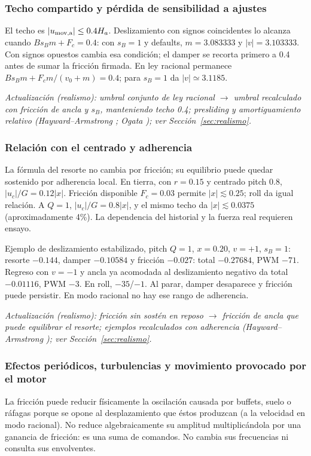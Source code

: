 \subsubsection{Techo compartido y pérdida de sensibilidad a ajustes}
El techo es $|u_{\rm mov,a}|\le0.4H_a$. Deslizamiento con signos coincidentes lo alcanza cuando $Bs_Bm+F_c=0.4$: con $s_B=1$ y defaults, $m=3.083333$ y $|v|=3.103333$. Con signos opuestos cambia esa condición; el damper se recorta primero a 0.4 antes de sumar la fricción firmada. En ley racional permanece $Bs_Bm+F_cm/(v_0+m)=0.4$; para $s_B=1$ da $|v|\simeq3.1185$.

\textit{Actualización (realismo): umbral conjunto de ley racional $\rightarrow$ umbral recalculado con fricción de ancla y $s_B$, manteniendo techo 0.4; presliding y amortiguamiento relativo (Hayward--Armstrong \cite{hayward2000}; Ogata \cite{ogata}); ver Sección~\ref{sec:realismo}.}

\subsubsection{Relación con el centrado y adherencia}
La fórmula del resorte no cambia por fricción; su equilibrio puede quedar sostenido por adherencia local. En tierra, con $r=0.15$ y centrado pitch 0.8, $|u_c|/G=0.12|x|$. Fricción disponible $F_c=0.03$ permite $|x|\lesssim0.25$; roll da igual relación. A $Q=1$, $|u_c|/G=0.8|x|$, y el mismo techo da $|x|\lesssim0.0375$ (aproximadamente 4\%). La dependencia del historial y la fuerza real requieren ensayo.

Ejemplo de deslizamiento estabilizado, pitch $Q=1$, $x=0.20$, $v=+1$, $s_B=1$: resorte $-0.144$, damper $-0.10584$ y fricción $-0.027$: total $-0.27684$, PWM $-71$. Regreso con $v=-1$ y ancla ya acomodada al deslizamiento negativo da total $-0.01116$, PWM $-3$. En roll, $-35$/$-1$. Al parar, damper desaparece y fricción puede persistir. En modo racional no hay ese rango de adherencia.

\textit{Actualización (realismo): fricción sin sostén en reposo $\rightarrow$ fricción de ancla que puede equilibrar el resorte; ejemplos recalculados con adherencia (Hayward--Armstrong \cite{hayward2000}); ver Sección~\ref{sec:realismo}.}

\subsubsection{Efectos periódicos, turbulencias y movimiento provocado por el motor}
La fricción puede reducir físicamente la oscilación causada por buffets, suelo o ráfagas porque se opone al desplazamiento que éstos produzcan (a la velocidad en modo racional). No reduce algebraicamente su amplitud multiplicándola por una ganancia de fricción: es una suma de comandos. No cambia sus frecuencias ni consulta sus envolventes.

